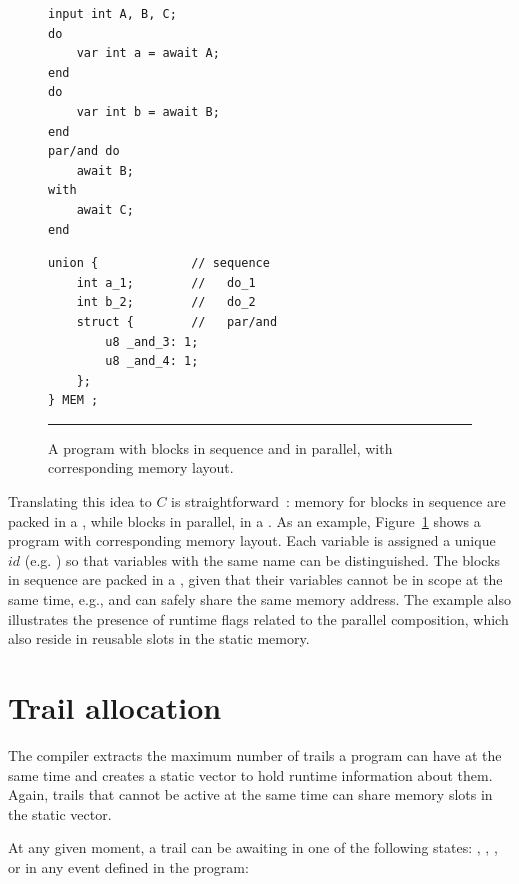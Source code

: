 \begin{figure}[t]
\begin{minipage}[t]{0.45\linewidth}
\begin{lstlisting}
input int A, B, C;
do
    var int a = await A;
end
do
    var int b = await B;
end
par/and do
    await B;
with
    await C;
end
\end{lstlisting}
\end{minipage}
%
\begin{minipage}[t]{0.55\linewidth}
\begin{lstlisting}
union {             // sequence
    int a_1;        //   do_1
    int b_2;        //   do_2
    struct {        //   par/and
        u8 _and_3: 1;
        u8 _and_4: 1;
    };
} MEM ;
\end{lstlisting}
\end{minipage}
\rule{14cm}{0.37pt}
\caption{
A program with blocks in sequence and in parallel, with corresponding memory 
layout.
{\small %
}%
\label{lst.impl.mem}
}
\end{figure}

Translating this idea to $C$ is straightforward~\cite{wsn.osm,wsn.ocram}: 
memory for blocks in sequence are packed in a , while blocks in 
parallel, in a .
%
As an example, Figure~\ref{lst.impl.mem} shows a program with corresponding 
memory layout.
%
Each variable is assigned a unique $id$ (e.g. ) so that variables 
with the same name can be distinguished.
%
The  blocks in sequence are packed in a , given that 
their variables cannot be in scope at the same time, e.g.,  and 
 can safely share the same memory address.
%
The example also illustrates the presence of runtime flags related to the 
parallel composition, which also reside in reusable slots in the static memory.

\section{Trail allocation}
\label{sec:impl:gates}

The compiler extracts the maximum number of trails a program can have at the 
same time and creates a static vector to hold runtime information about them.
Again, trails that cannot be active at the same time can share memory slots in 
the static vector.

At any given moment, a trail can be awaiting in one of the following states: 
, , , or in any event defined in the 
program:

